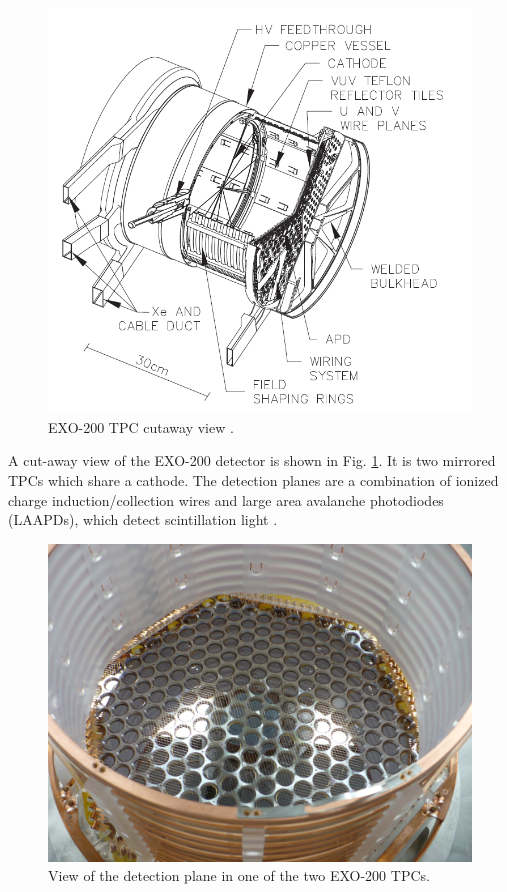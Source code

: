 \begin{figure} %
	\centering
	\includegraphics[width=.9\textwidth]{figures/TPC.png}
	\caption{EXO-200 TPC cutaway view \cite{EXO200TwoNuLong}.}
\label{fig:tpc}
\end{figure}

A cut-away view of the EXO-200 detector is shown in Fig. \ref{fig:tpc}.  It is two mirrored TPCs which share a cathode.  The detection planes are a combination of ionized charge induction/collection wires and large area avalanche photodiodes (LAAPDs), which detect scintillation light \cite{APDs}.

\begin{figure} %
	\centering
	\includegraphics[width=.9\textwidth]{figures/TPCphoto.jpeg}
	\caption{View of the detection plane in one of the two EXO-200 TPCs.}
\label{fig:tpcphoto}
\end{figure}

